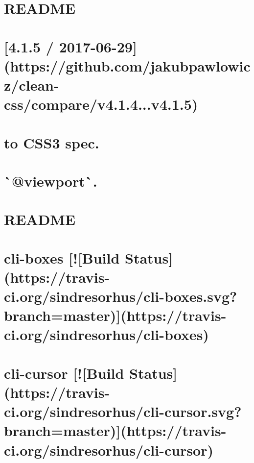 \documentclass[twoside]{book}
\newcommand{\+}{\discretionary{\mbox{\scriptsize$\hookleftarrow$}}{}{}}
\begin{document}
\chapter{R\+E\+A\+D\+ME}
\label{md__c_1_workspace_demo_src_main_script_node_modules_clap__r_e_a_d_m_e}

\chapter{\mbox{[}4.1.5 / 2017-\/06-\/29\mbox{]}(https\+://github.com/jakubpawlowicz/clean-\/css/compare/v4.1.4...v4.1.5)}
\label{md__c_1_workspace_demo_src_main_script_node_modules_clean-css__history}

\chapter{to C\+S\+S3 spec.}
\label{according}

\chapter{\`{}@viewport\`{}.}
\label{and}

\chapter{R\+E\+A\+D\+ME}
\label{md__c_1_workspace_demo_src_main_script_node_modules_clean-css__r_e_a_d_m_e}

\chapter{cli-\/boxes \mbox{[}!\mbox{[}Build Status\mbox{]}(https\+://travis-\/ci.org/sindresorhus/cli-\/boxes.svg?branch=master)\mbox{]}(https\+://travis-\/ci.org/sindresorhus/cli-\/boxes)}
\label{md__c_1_workspace_demo_src_main_script_node_modules_cli-boxes_readme}

\chapter{cli-\/cursor \mbox{[}!\mbox{[}Build Status\mbox{]}(https\+://travis-\/ci.org/sindresorhus/cli-\/cursor.svg?branch=master)\mbox{]}(https\+://travis-\/ci.org/sindresorhus/cli-\/cursor)}
\label{md__c_1_workspace_demo_src_main_script_node_modules_cli-cursor_readme}

\end{document}
